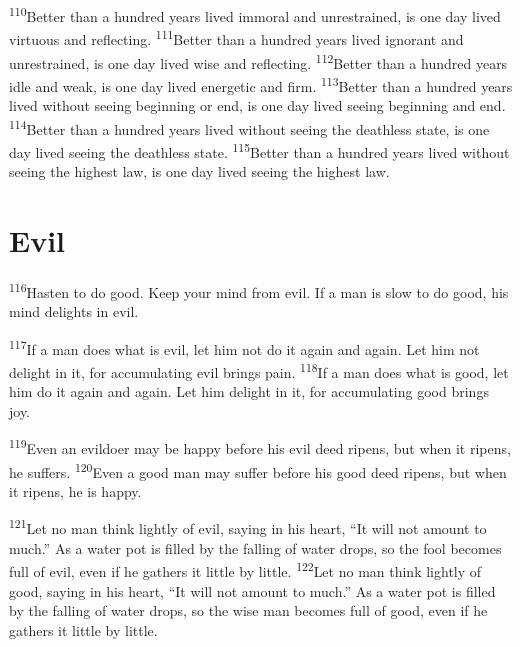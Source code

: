\documentclass[openany,12pt,english]{book}
\newenvironment{para}{\par\pretolerance=100\tolerance=200\setlength{\emergencystretch}{0.6em}\relax}{\par}
\begin{document}
\begin{para}
    \textsuperscript{110}\thinspace{}Bet\-ter than a hun\-dred years lived im\-mor\-al and un\-re\-strained, is one day lived vir\-tu\-ous and reflecting.
    \textsuperscript{111}\thinspace{}Bet\-ter than a hun\-dred years lived ig\-no\-rant and un\-re\-strained, is one day lived wise and reflecting.
    \textsuperscript{112}\thinspace{}Bet\-ter than a hun\-dred years i\-dle and weak, is one day lived en\-er\-get\-ic and firm.
    \textsuperscript{113}\thinspace{}Bet\-ter than a hun\-dred years lived with\-out see\-ing be\-gin\-ning or end, is one day lived see\-ing be\-gin\-ning and end.
    \textsuperscript{114}\thinspace{}Bet\-ter than a hun\-dred years lived with\-out see\-ing the death\-less state, is one day lived see\-ing the death\-less state.
    \textsuperscript{115}\thinspace{}Bet\-ter than a hun\-dred years lived with\-out see\-ing the highest law, is one day lived see\-ing the highest law.
\end{para}

\section*{Evil}
\begin{para}
    \textsuperscript{116}\thinspace{}Has\-ten to do good. Keep your mind from evil. If a man is slow to do good, his mind delights in evil.
\end{para}

\begin{para}
    \textsuperscript{117}\thinspace{}If a man does what is evil, let him not do it a\-gain and a\-gain. Let him not de\-light in it, for ac\-cu\-mu\-lat\-ing evil brings pain.
    \textsuperscript{118}\thinspace{}If a man does what is good, let him do it a\-gain and a\-gain. Let him de\-light in it, for ac\-cu\-mu\-lat\-ing good brings joy.
\end{para}

\begin{para}
    \textsuperscript{119}\thinspace{}E\-ven an evil\-do\-er may be hap\-py be\-fore his evil deed ripens, but when it ripens, he suffers.
    \textsuperscript{120}\thinspace{}E\-ven a good man may suf\-fer be\-fore his good deed ripens, but when it ripens, he is hap\-py.
\end{para}

\begin{para}
    \textsuperscript{121}\thinspace{}Let no man think light\-ly of evil, say\-ing in his heart, “It will not a\-mount to much.” As a wa\-ter pot is filled by the fall\-ing of wa\-ter drops, so the fool becomes full of evil, e\-ven if he gathers it lit\-tle by lit\-tle.
    \textsuperscript{122}\thinspace{}Let no man think light\-ly of good, say\-ing in his heart, “It will not a\-mount to much.” As a wa\-ter pot is filled by the fall\-ing of wa\-ter drops, so the wise man becomes full of good, e\-ven if he gathers it lit\-tle by lit\-tle.
\end{para}
\end{document}
